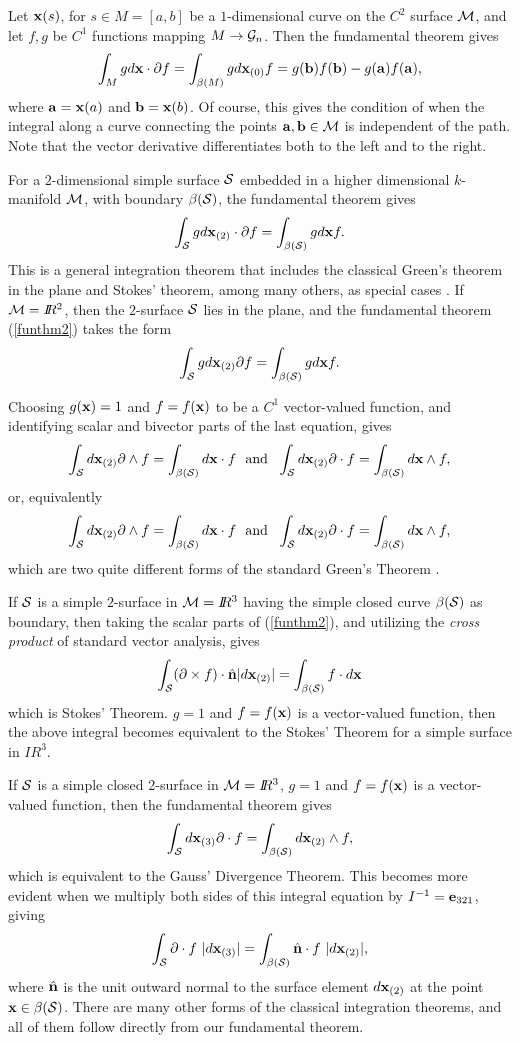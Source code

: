 \documentclass[12]{article}
\def\bx{{\bf x}}
\def\bn{{\bf n}}
\def\ba{{\bf a}}
\def\bb{{\bf b}}
\def\be{{\bf e}}
\def\R{I\!\!R}
\def\beq{\begin{equation}}
\def\eeq{\end{equation}}
\def\w{\wedge}
\def\G{I\!\!\!G}
\def\d{\partial}
\def \xx {{\bf x}}
\def \G {{\cal G}}
\begin{document}
Let $\bx(s)$, for $s\in M=[a,b]$ be a $1$-dimensional curve on the $C^2$ surface $\cal M$, and let
$f,g$ be $C^1$ functions mapping $M \to \G_n$. Then the fundamental theorem gives
 \[  \int_{M}g d\xx \cdot \d f=
  \int_{\beta(M)}gd\xx_{(0)}f = g(\bb)f(\bb)- g(\ba)f(\ba), \]
 where $\ba=\bx(a)$ and $\bb=\bx(b)$. Of course, this gives the condition of when the integral along a curve
 connecting the points $\ba, \bb \in {\cal M}$ is independent of the path. Note that the
 vector derivative differentiates both to the left and to the right.

For a $2$-dimensional simple surface ${\cal S}$ embedded in a higher dimensional $k$-manifold  
${\cal M} $, with boundary $\beta({\cal S})$, the fundamental theorem gives
  \beq  \int_{\cal S}g d\xx_{(2)}\cdot \d f=\int_{\beta({\cal S})}gd \xx f . \label{funthm2} \eeq
This is a general integration theorem that includes 
the classical Green's theorem in the plane and Stokes' theorem, among many others, as special cases \cite{outline}.
 If ${\cal M}=\R^2$, then the $2$-surface ${\cal S}$ lies in the plane, and the fundamental
 theorem (\ref{funthm2}) takes the form
  \[   \int_{\cal S}g d\xx_{(2)} \d f=\int_{\beta({\cal S})}gd \xx f .  \]
  
   Choosing
$g(\bx)=1$ and $f=f(\bx)$ to be a $C^1$ vector-valued function, and identifying scalar
and bivector parts of the last equation, gives
  \[   \int_{\cal S} d\xx_{(2)} \d \w f=\int_{\beta({\cal S})} d \xx \cdot f \ \ {\rm and} \ \  
  \int_{\cal S} d\xx_{(2)} \d \cdot f=\int_{\beta({\cal S})} d \xx \w f, \]
 or, equivalently
  \[   \int_{\cal S} d\xx_{(2)} \d \w f=\int_{\beta({\cal S})} d \xx \cdot f \ \ {\rm and} \ \  
  \int_{\cal S} d\xx_{(2)} \d \cdot f=\int_{\beta({\cal S})} d \xx \w f, \]
  which are two quite different forms of the standard Green's Theorem \cite[p. 110]{outline}.  
  
   If ${\cal S}$ is a simple $2$-surface in
  ${\cal M}=\R^3$ having the simple closed curve $\beta({\cal S})$ as boundary, then 
  taking the scalar parts of (\ref{funthm2}), and utilizing the {\it cross product} of
  standard vector analysis, gives
    \[ \int_{\cal S}( \d \times f)\cdot \hat \bn |d\xx_{(2)}| =\int_{\beta({\cal S})} f \cdot d \xx   \]
  which is Stokes' Theorem.   
   $g=1$ and $f=f(\bx)$ is a vector-valued function, then the
   above integral becomes equivalent to the Stokes' Theorem for a simple surface in $\R^3$.   

 If ${\cal S}$ is a simple closed $2$-surface in
  ${\cal M}=\R^3$, $g=1$ and $f=f(\bx)$ is a vector-valued function, then the
  fundamental theorem gives  
   \[  \int_{\cal S} d\xx_{(3)} \d \cdot f=\int_{\beta({\cal S})}d \xx_{(2)} \w f, \]
 which is equivalent to the Gauss' Divergence Theorem. This becomes more evident when we multiply
 both sides of this integral equation by $I^{-1}=\be_{321}$, giving
    \[  \int_{\cal S} \d \cdot f \ |d\xx_{(3)}|=\int_{\beta({\cal S})}  \hat \bn \cdot f\ |  d \xx_{(2)}|, \]
where $\hat \bn$ is the unit outward normal to the surface element $d \xx_{(2)}$ at the point $\bx \in
 \beta({\cal S})$. There are many other forms of the classical integration theorems, and all of them
 follow directly from our fundamental theorem.  
 
\end{document}
